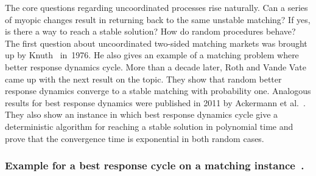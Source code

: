 \documentclass{llncs}
\begin{document}
The core questions regarding uncoordinated processes rise naturally. Can a series of myopic changes result in returning back to the same unstable matching? If yes, is there a way to reach a stable solution? How do random procedures behave? The first question about uncoordinated two-sided matching markets was brought up by Knuth~\cite{Knuth:1976:MSR} in~1976. He also gives an example of a matching problem where better response dynamics cycle. More than a decade later, Roth and Vande Vate~\cite{roth_vandevate} came up with the next result on the topic. They show that random better response dynamics converge to a stable matching with probability one. Analogous results for best response dynamics were published in 2011 by Ackermann et al.~\cite{ackermann2011uncoordinated}. They also show an instance in which best response dynamics cycle give a deterministic algorithm for reaching a stable solution in polynomial time and prove that the convergence time is exponential in both random cases.

\subsubsection{Example for a best response cycle on a matching instance~\cite{ackermann2011uncoordinated}.}
\end{document}
